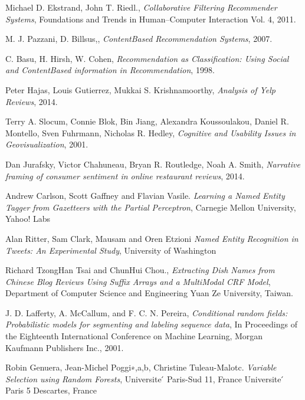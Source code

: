 \documentclass[twoside,12pt]{article}
\begin{document}

\begin{thebibliography}{9}

  Michael D. Ekstrand, John T. Riedl.,
  \emph{Collaborative Filtering Recommender Systems},
  Foundations and Trends in Human–Computer Interaction Vol. 4,
  2011.

  M. J. Pazzani, D. Billsus,,
  \emph{Content­Based Recommendation Systems},
  2007.

  C. Basu, H. Hirsh, W. Cohen,
  \emph{Recommendation as Classification: Using Social and 
  Content­Based information in Recommendation},
  1998.

  Peter Hajas, Louis Gutierrez, Mukkai S. Krishnamoorthy,
  \emph{Analysis of Yelp Reviews},
  2014.

  Terry A. Slocum, Connie Blok, Bin Jiang, Alexandra Koussoulakou, Daniel R. Montello, Sven Fuhrmann, Nicholas R. Hedley,
  \emph{Cognitive and Usability Issues in Geovisualization},
  2001.

  Dan Jurafsky, Victor Chahuneau, Bryan R. Routledge, Noah A. Smith,
  \emph{Narrative framing of consumer sentiment in online restaurant reviews},
  2014.
  
  Andrew Carlson, Scott Gaffney and Flavian Vasile.
   \emph{Learning a Named Entity Tagger from Gazetteers with the Partial Perceptron},
   Carnegie Mellon University,
   Yahoo! Labs

  Alan Ritter, Sam Clark, Mausam and Oren Etzioni
   \emph{Named Entity Recognition in Tweets: An Experimental Study},
   University of Washington

    Richard Tzong­Han Tsai and Chun­Hui Chou.,
    \emph{Extracting Dish Names from Chinese Blog Reviews Using Suffix Arrays and a Multi­Modal CRF Model},
    Department of Computer Science and Engineering Yuan Ze University, 
    Taiwan.
    
    J. D. Lafferty, A. McCallum, and F. C. N. Pereira,
    \emph{Conditional random fields: Probabilistic models for segmenting and labeling sequence data},
    In Proceedings of the Eighteenth International Conference on Machine Learning,
    Morgan Kaufmann Publishers Inc.,
    2001.

    Robin Genuera, Jean-Michel Poggi∗,a,b, Christine Tuleau-Malotc.
    \emph{Variable Selection using Random Forests},
   Universite ́ Paris-Sud 11, France
   Universite ́ Paris 5 Descartes, France
   



\end{thebibliography}
\end{document}

